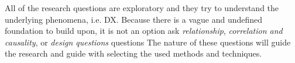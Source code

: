 \documentclass[english, 12pt, a4paper, sci, utf8, a-1b, online]{aaltothesis}
\begin{document}
All of the research questions are exploratory and they try to understand the underlying phenomena, i.e. DX. Because there is a vague and undefined foundation to build upon, it is not an option ask \textit{relationship}, \textit{correlation and causality}, or \textit{design questions} questions  The nature of these questions will guide the research and guide with selecting the used methods and techniques.






\end{document}
